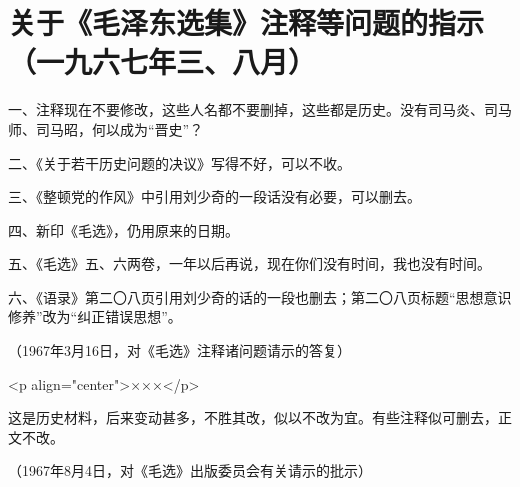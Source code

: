 \section[关于《毛泽东选集》注释等问题的指示（一九六七年三、八月）]{关于《毛泽东选集》注释等问题的指示（一九六七年三、八月）}


一、注释现在不要修改，这些人名都不要删掉，这些都是历史。没有司马炎、司马师、司马昭，何以成为“晋史”？

二、《关于若干历史问题的决议》写得不好，可以不收。

三、《整顿党的作风》中引用刘少奇的一段话没有必要，可以删去。

四、新印《毛选》，仍用原来的日期。

五、《毛选》五、六两卷，一年以后再说，现在你们没有时间，我也没有时间。

六、《语录》第二〇八页引用刘少奇的话的一段也删去；第二〇八页标题“思想意识修养”改为“纠正错误思想”。

{\raggedleft （1967年3月16日，对《毛选》注释诸问题请示的答复）\par}

<p align="center">×××</p>

这是历史材料，后来变动甚多，不胜其改，似以不改为宜。有些注释似可删去，正文不改。

{\raggedleft （1967年8月4日，对《毛选》出版委员会有关请示的批示）\par}


